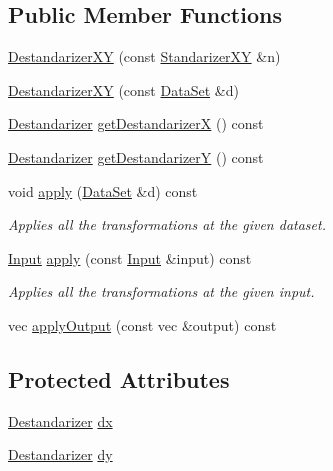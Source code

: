 \subsection*{Public Member Functions}
\begin{DoxyCompactItemize}
\item 
\hyperlink{classhappyml_1_1DestandarizerXY_a3acaf6aea99a5c5fdc3e6f4cd22d82bd}{Destandarizer\+XY} (const \hyperlink{classhappyml_1_1StandarizerXY}{Standarizer\+XY} \&n)
\item 
\hyperlink{classhappyml_1_1DestandarizerXY_aa2ad85844e63d1f359ac867e6eaa321e}{Destandarizer\+XY} (const \hyperlink{classhappyml_1_1DataSet}{Data\+Set} \&d)
\item 
\hyperlink{classhappyml_1_1Destandarizer}{Destandarizer} \hyperlink{classhappyml_1_1DestandarizerXY_a3c6a17ec4130156001573205e0a313f6}{get\+DestandarizerX} () const 
\item 
\hyperlink{classhappyml_1_1Destandarizer}{Destandarizer} \hyperlink{classhappyml_1_1DestandarizerXY_ad4b4914107d212cc5167269beb99c21e}{get\+DestandarizerY} () const 
\item 
void \hyperlink{classhappyml_1_1DestandarizerXY_a84c63216d9a78bc61647550381fed0a6}{apply} (\hyperlink{classhappyml_1_1DataSet}{Data\+Set} \&d) const 
\begin{DoxyCompactList}\small\item\em Applies all the transformations at the given dataset. \end{DoxyCompactList}\item 
\hyperlink{namespacehappyml_a03602d1ec49393790b8a0449f40cd01f}{Input} \hyperlink{classhappyml_1_1DestandarizerXY_a21481d414441642b50b04d43f6c55ac0}{apply} (const \hyperlink{namespacehappyml_a03602d1ec49393790b8a0449f40cd01f}{Input} \&input) const 
\begin{DoxyCompactList}\small\item\em Applies all the transformations at the given input. \end{DoxyCompactList}\item 
vec \hyperlink{classhappyml_1_1DestandarizerXY_a09d965fba7e7dfb174cbd7fbd84ac24b}{apply\+Output} (const vec \&output) const 
\end{DoxyCompactItemize}
\subsection*{Protected Attributes}
\begin{DoxyCompactItemize}
\item 
\hyperlink{classhappyml_1_1Destandarizer}{Destandarizer} \hyperlink{classhappyml_1_1DestandarizerXY_aeaa319686a49d6a844cd4c2a259c97ef}{dx}
\item 
\hyperlink{classhappyml_1_1Destandarizer}{Destandarizer} \hyperlink{classhappyml_1_1DestandarizerXY_ac482475137a51829da3d1a9f99817960}{dy}
\end{DoxyCompactItemize}


